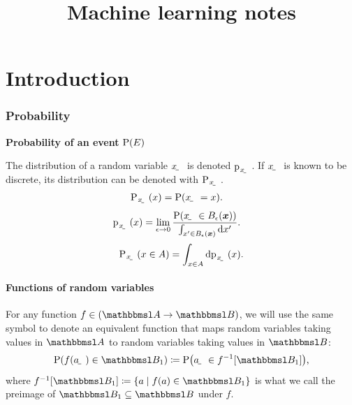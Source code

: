 \documentclass{article}
\title{Machine learning notes}
\author{}
\date{}
\begin{document}
\maketitle

\tableofcontents

\newpage

\begingroup
\onehalfspacing
\printunsrtglossary[type=symbols,style=supergroup,title={Notation}]
\endgroup

\part{Introduction}

\section{Probability}


\textbf{Probability of an event} $\P(E)$

The distribution of a random variable $\rvar x$ is denoted $\p_\rvar{x}$. If $\rvar x$ is known to be discrete, its distribution can be denoted with $\P_\rvar{x}$. 
\begin{align}
    \P_\rvar{x}(x) &= \P(\rvar x = x) \text.
\end{align}
\begin{align}
    \p_\rvar{x}(x) &= \lim_{\epsilon\to0}\frac{\P\del{\rvar x\in B_\epsilon(\vec x)}}{\int_{x'\in B_\epsilon(\vec x)}\dif x'} \text.
\end{align}
\begin{align}
    \P_\rvar{x}(x\in A) = \int_{x\in A}\dif \p_\rvar{x}(x) \text.
\end{align}

\subsection{Functions of random variables}

For any function $f\in(\set A\to\set B)$, we will use the same symbol to denote an equivalent function that maps random variables taking values in $\set A$ to random variables taking values in $\set B$:
\begin{align}
    \P(f(\rvar a)\in \set B_1) \coloneqq \P\del{\rvar a\in f^{-1}\sbr{\set B_1}} \text,
\end{align}
where $f^{-1}\sbr{\set B_1} \coloneqq \cbr{a\mid f(a)\in \set B_1}$ is what we call the preimage of $\set B_1\subseteq\set B$ under $f$.
\end{document}
